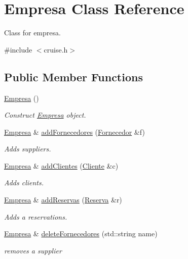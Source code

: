 \hypertarget{classEmpresa}{}\section{Empresa Class Reference}
\label{classEmpresa}


Class for empresa.  




{\ttfamily \#include $<$cruise.\+h$>$}

\subsection*{Public Member Functions}
\begin{DoxyCompactItemize}
\item 
\hyperlink{classEmpresa_aff124b958356c479ab50ddf4cf302193}{Empresa} ()
\begin{DoxyCompactList}\small\item\em Construct \hyperlink{classEmpresa}{Empresa} object. \end{DoxyCompactList}\item 
\hyperlink{classEmpresa}{Empresa} \& \hyperlink{classEmpresa_a0c858479d6e92094adbb2fc085039376}{add\+Fornecedores} (\hyperlink{classFornecedor}{Fornecedor} \&f)
\begin{DoxyCompactList}\small\item\em Adds suppliers. \end{DoxyCompactList}\item 
\hyperlink{classEmpresa}{Empresa} \& \hyperlink{classEmpresa_a57597ec4154f274686bc648ccf5d2a59}{add\+Clientes} (\hyperlink{classCliente}{Cliente} \&c)
\begin{DoxyCompactList}\small\item\em Adds clients. \end{DoxyCompactList}\item 
\hyperlink{classEmpresa}{Empresa} \& \hyperlink{classEmpresa_a42a1671b234ab8380cfb2ed33517edb2}{add\+Reservas} (\hyperlink{classReserva}{Reserva} \&r)
\begin{DoxyCompactList}\small\item\em Adds a reservations. \end{DoxyCompactList}\item 
\hyperlink{classEmpresa}{Empresa} \& \hyperlink{classEmpresa_ab8b7dda77caceec58e464c16b7e45f7c}{delete\+Fornecedores} (std\+::string name)
\begin{DoxyCompactList}\small\item\em removes a supplier \end{DoxyCompactList}\item 

\end{DoxyCompactItemize}
